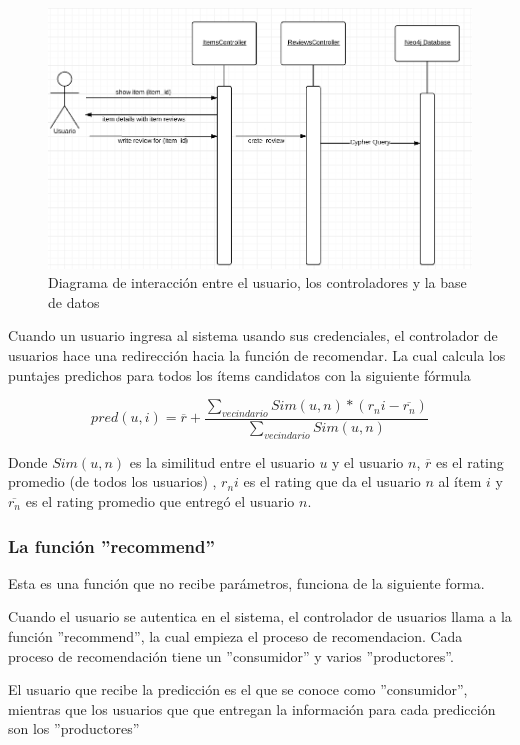 \begin{figure}[hbtp]
\centering
\includegraphics[scale=0.8]{images/review_history.png}
\caption{Diagrama de interacción entre el usuario, los controladores y la base de datos}
\end{figure}

Cuando un usuario ingresa al sistema usando sus credenciales, el controlador de usuarios hace una redirección hacia la función de recomendar. La cual calcula los puntajes predichos para todos los ítems candidatos con la siguiente fórmula 

\begin{equation}
pred(u,i) = \overline{r} + \frac{\sum\limits_{vecindario} Sim(u,n) * (r_ni - \overline{r_n} )}{\sum\limits_{vecindario} Sim(u,n)}
\end{equation}

Donde $Sim(u,n)$ es la similitud entre el usuario $u$ y el usuario $n$, $\overline{r}$ es el rating promedio (de todos los usuarios) , $r_ni$ es el rating que da el usuario $n$ al ítem $i$ y $\overline{r_n}$ es el rating promedio que entregó el usuario $n$. 

\subsubsection{La función ''recommend''}

Esta es una función que no recibe parámetros, funciona de la siguiente forma. 

Cuando el usuario se autentica en el sistema, el controlador de usuarios llama a la función ''recommend'', la cual empieza el proceso de recomendacion. Cada proceso de recomendación tiene un ''consumidor'' y varios ''productores''. 

El usuario que recibe la predicción es el que se conoce como ''consumidor'', mientras que los usuarios que que entregan la información para cada predicción son los ''productores''

